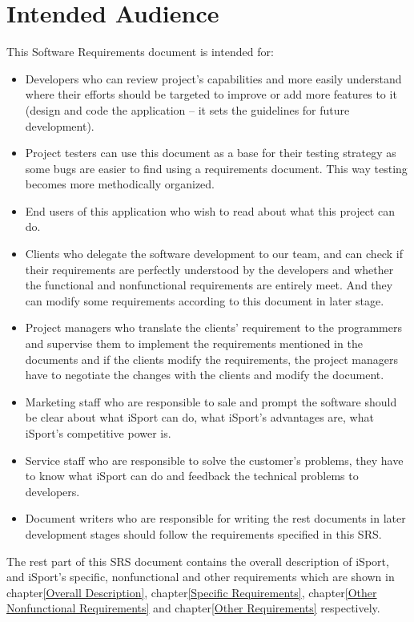 \documentclass[16pt]{scrreprt}
\begin{document}
\section{Intended Audience}
This Software Requirements document is intended for:
\begin{itemize}
	\item Developers who can review project’s capabilities and more easily understand where their efforts should be targeted to improve or add more features to it (design and code the application – it sets the guidelines for future development).
	\item Project testers can use this document as a base for their testing strategy as some bugs are easier to find using a requirements document. This way testing becomes more methodically organized.
   \item End users of this application who wish to read about what this project can do.
   \item Clients who delegate the software development to our team, and can check if their requirements are perfectly understood by the developers and whether the functional and nonfunctional requirements are entirely meet. And they can modify some requirements according to this document in later stage. 
   \item Project managers who translate the clients' requirement to the programmers and supervise them to implement the requirements mentioned in the documents and if the clients modify the requirements, the project managers have to negotiate the changes with the clients and modify the document.
   \item Marketing staff who are responsible to sale and prompt the software should be clear about what iSport can do, what iSport's advantages are, what iSport's competitive power is.
   \item Service staff who are responsible to solve the customer's problems, they have to know what iSport can do and feedback the technical problems to developers.
   \item Document writers who are responsible for writing the rest documents in later development stages should follow the requirements specified in this SRS.
\end{itemize}
The rest part of this SRS document contains the overall description of iSport, and iSport's specific, nonfunctional and other requirements which are shown in chapter\ref{Overall Description}, chapter\ref{Specific Requirements}, chapter\ref{Other Nonfunctional Requirements} and chapter\ref{Other Requirements} respectively.
\end{document}
